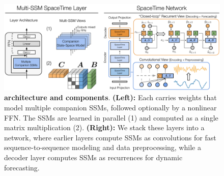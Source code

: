 \begin{figure}[!t]
  \centering
    \includegraphics[width=1\textwidth]{_ICLR2023_paper/figures/space_time_architecture_v2_flipped.pdf}
  \caption{ \textbf{\ourmethod{} architecture and components}. \textbf{(Left):} Each \ourmethodunit{} carries weights that model multiple companion SSMs, followed optionally by a nonlinear FFN. The SSMs are learned in parallel (1) and computed as a single matrix multiplication (2). 
  \textbf{(Right):} We stack these layers into a \ourmethod{} network, where
  earlier layers compute SSMs as convolutions for fast sequence-to-sequence modeling and data preprocessing, while a decoder layer computes SSMs as recurrences for dynamic forecasting.}
  \label{fig:arch_overview} 
\end{figure}






